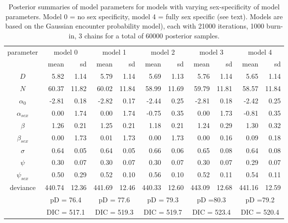 \begin{table}[htp]
\centering
\caption{
Posterior summaries of model parameters for models with varying
sex-specificity of model parameters. Model 0 = no sex specificity,
model 4 = fully sex specific (see text). 
Models are based on the 
 Gaussian encounter probability model), each with 21000 iterations,
 1000 burn-in, 3 chains for a total of 60000 posterior samples. 
}
\begin{tabular}{crrrrrrrrrr} \hline \hline
parameter & \multicolumn{2}{c}{model 0} &
\multicolumn{2}{c}{model 1} &
\multicolumn{2}{c}{model 2} &
\multicolumn{2}{c}{model 3} &
\multicolumn{2}{c}{model 4}  \\
        &    mean &   sd &      mean &   sd &      mean &   sd &
        mean&     sd  & mean & sd\\ \hline
$D$      &     5.82 & 1.14 &  5.79&  1.14&   5.69&  1.13&   5.76&  1.14& 5.65&  1.14 \\
$N$     &     60.37 &11.82 & 60.02& 11.84&  58.99& 11.69&  59.79& 11.81&58.57& 11.84 \\
$\alpha_0$   &   -2.81 & 0.18 & -2.82&  0.17&  -2.44&  0.25&  -2.81&  0.18&-2.42&  0.25 \\
$\alpha_{sex}$ &  0.00 & 1.74 &  0.00&  1.74&  -0.75&  0.35&   0.00&  1.73&-0.81&  0.35 \\
$\beta$        &1.26 & 0.21 &  1.25&  0.21&   1.18&  0.21&   1.24&  0.29&1.30&  0.32 \\
$\beta_{sex} $   &0.00 & 1.73 &  0.01&  1.73&   0.00&  1.73&   0.00&  0.16&0.09&  0.18 \\
$\sigma$       &0.64 & 0.05 &  0.64&  0.05&   0.66&  0.06&   0.65&  0.08&0.64&  0.08 \\
$\psi$         &0.30 & 0.07 &  0.30&  0.07&   0.30&  0.07&   0.30&  0.07&0.29&  0.07 \\
$\psi_{sex}$    &0.50 & 0.29 &  0.52&  0.10&   0.56&  0.10&   0.52&  0.11&0.54&  0.11 \\
deviance   &440.74 &12.36 &441.69& 12.46& 440.33& 12.60& 443.09& 12.68&441.16& 12.59 \\ \hline
  & \multicolumn{2}{c}{pD = 76.4} &\multicolumn{2}{c}{pD = 77.6} & \multicolumn{2}{c}{pD = 79.3}
& \multicolumn{2}{c}{pD =80.3}  & \multicolumn{2}{c}{pD =79.2}  \\
& \multicolumn{2}{c}{DIC = 517.1} & \multicolumn{2}{c}{DIC = 519.3} &
\multicolumn{2}{c}{DIC = 519.7} &    \multicolumn{2}{c}{DIC = 523.4} &
\multicolumn{2}{c}{DIC = 520.4} \\ \hline
\end{tabular}
\label{gof.tab.dic}
\end{table}





